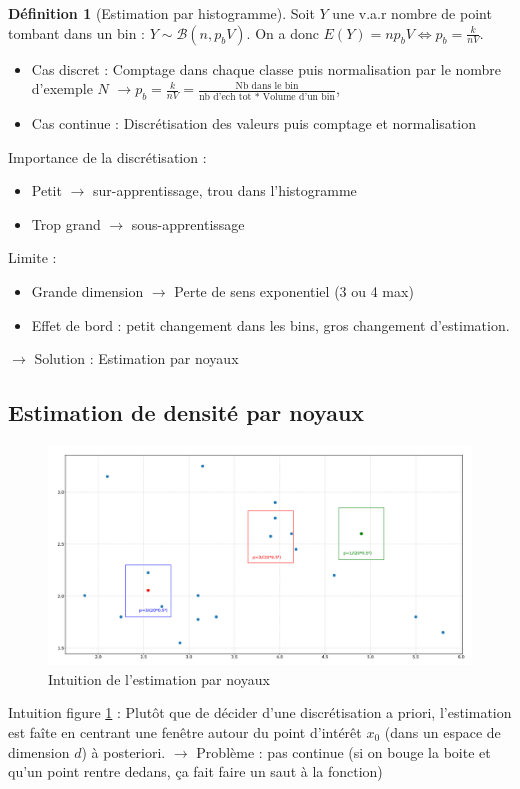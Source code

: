 \documentclass{article}
\theoremstyle{plain}%
\theoremstyle{definition}
\newtheorem{defn}{Définition}[section]
\theoremstyle{remark}
\begin{document}
\begin{defn}[Estimation par histogramme]
    Soit $ Y $ une v.a.r nombre de point tombant dans un bin : $ Y \sim \mathcal{B}(n, p_b V)$. On a donc $ E(Y) = n p_b V \Leftrightarrow p_b = \frac{k}{nV} $. 
    \begin{itemize}
        \item Cas discret : Comptage dans chaque classe puis normalisation par le nombre d'exemple $ N $ $\rightarrow p_b = \frac{k}{nV} = \frac{\text{Nb dans le bin}}{\text{nb d'ech tot }*\text{ Volume d'un bin}}$,
        \item Cas continue : Discrétisation des valeurs puis comptage et normalisation
    \end{itemize}
\end{defn}
Importance de la discrétisation : \begin{itemize}
    \item Petit $\rightarrow$ sur-apprentissage, trou dans l'histogramme
    \item Trop grand $\rightarrow$ sous-apprentissage
\end{itemize}
Limite : \begin{itemize}
    \item Grande dimension $\rightarrow$ Perte de sens exponentiel (3 ou 4 max)
    \item Effet de bord : petit changement dans les bins, gros changement d'estimation. 
\end{itemize}
$\rightarrow$ Solution : Estimation par noyaux

\subsection{Estimation de densité par noyaux}
\begin{figure}[htbp]
    \centering
    \includegraphics*[width=\textwidth]{./fig1.png}
    \caption{Intuition de l'estimation par noyaux}
    \label{intuition_noyaux}
\end{figure}
Intuition figure \ref*{intuition_noyaux} : Plutôt que de décider d'une discrétisation a priori, l'estimation est faîte en centrant une fenêtre autour du point d'intérêt $ x_0 $  (dans un espace de dimension $d$) à posteriori. $\rightarrow$ Problème : pas continue (si on bouge la boite et qu'un point rentre dedans, ça fait faire un saut à la fonction)
\end{document}
